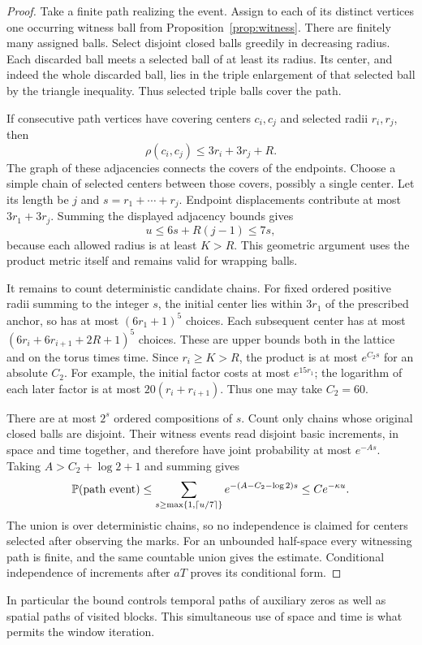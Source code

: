 \begin{proof}
Take a finite path realizing the event. Assign to each of its
distinct vertices one occurring witness ball from
Proposition~\ref{prop:witness}. There are finitely many assigned balls.
Select disjoint closed balls greedily in decreasing radius. Each
discarded ball meets a selected ball of at least its radius.
Its center, and indeed the whole discarded ball, lies in the
triple enlargement of that selected ball by the triangle inequality.
Thus selected triple balls cover the path.

If consecutive path vertices have covering centers \(c_i,c_j\)
and selected radii \(r_i,r_j\), then
\[
 \rho(c_i,c_j)\le3r_i+3r_j+R.
\]
The graph of these adjacencies connects the covers of the endpoints.
Choose a simple chain of selected centers between those covers,
possibly a single center. Let its length be \(j\) and
\(s=r_1+\cdots+r_j\). Endpoint displacements contribute at most
\(3r_1+3r_j\). Summing the displayed adjacency bounds gives
\[
 u\le6s+R(j-1)\le7s,
\]
because each allowed radius is at least \(K>R\). This geometric
argument uses the product metric itself and remains valid for
wrapping balls.

It remains to count deterministic candidate chains. For fixed
ordered positive radii summing to the integer \(s\), the initial
center lies within \(3r_1\) of the prescribed anchor, so has at most
\((6r_1+1)^5\) choices. Each subsequent center has at most
\((6r_i+6r_{i+1}+2R+1)^5\) choices. These are upper bounds both
in the lattice and on the torus times time. Since \(r_i\ge K>R\),
the product is at most \(e^{C_2s}\) for an absolute \(C_2\).
For example, the initial factor costs at most \(e^{15r_1}\);
the logarithm of each later factor is at most
\(20(r_i+r_{i+1})\). Thus one may take \(C_2=60\).

There are at most \(2^s\) ordered compositions of \(s\). Count only
chains whose original closed balls are disjoint. Their witness
events read disjoint basic increments, in space and time together,
and therefore have joint probability at most \(e^{-As}\).
Taking \(A>C_2+\log2+1\) and summing gives
\[
 \mathbb P(\text{path event})
 \le\sum_{s\ge\max\{1,\lceil u/7\rceil\}}
        e^{-(A-C_2-\log2)s}\le Ce^{-\kappa u}.
\]
The union is over deterministic chains, so no independence is
claimed for centers selected after observing the marks. For an
unbounded half-space every witnessing path is finite, and the same
countable union gives the estimate. Conditional independence of
increments after \(aT\) proves its conditional form.
\end{proof}

In particular the bound controls temporal paths of auxiliary zeros
as well as spatial paths of visited blocks. This simultaneous use
of space and time is what permits the window iteration.
